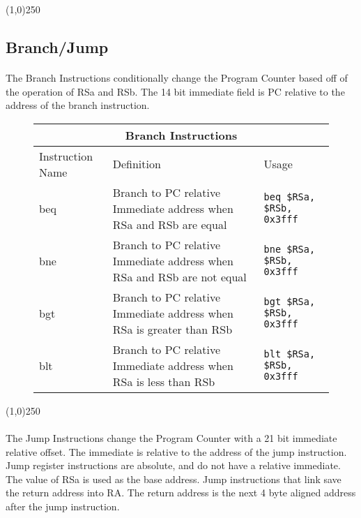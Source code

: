 \documentclass[letterpaper, 11pt]{article}
\begin{document}
\begin{center}
	\line(1,0){250}
\end{center}

\subsection{Branch/Jump}
\paragraph{} The Branch Instructions conditionally change the Program Counter based off of the operation of RSa and RSb. The 14 bit
immediate field is PC relative to the address of the branch instruction.

\begin{figure}[!h]
	\begin{center}
		\begin{tabular}{|l|l|l|}
			\hline
			\multicolumn{3}{c}{Branch Instructions} \\ \hline
			Instruction Name	& Definition																& Usage 							\\ \hline
			beq					& Branch to PC relative Immediate address when RSa and RSb are equal		& \texttt{beq \$RSa, \$RSb, 0x3fff}	\\ \hline
			bne					& Branch to PC relative Immediate address when RSa and RSb are not equal 	& \texttt{bne \$RSa, \$RSb, 0x3fff}	\\ \hline
			bgt					& Branch to PC relative Immediate address when RSa is greater than RSb	 	& \texttt{bgt \$RSa, \$RSb, 0x3fff}	\\ \hline
			blt					& Branch to PC relative Immediate address when RSa is less than RSb			& \texttt{blt \$RSa, \$RSb, 0x3fff}	\\ \hline
		 		\end{tabular} 
	\end{center}
	
\end{figure}
\begin{center}
	\line(1,0){250}
\end{center}


\paragraph{} The Jump Instructions change the Program Counter with a 21 bit immediate relative offset. The immediate is relative to the address
of the jump instruction. Jump register instructions are absolute, and do not have a relative immediate. The value of RSa is used as the base address.
Jump instructions that link save the return address into RA. The return address is the next 4 byte aligned address after the jump instruction.
\end{document}
